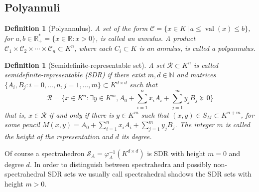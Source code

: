 \documentclass[sigconf]{acmart}
\newcommand{\R}{\mathbb{R}} %
\newcommand{\N}{\mathbb{N}} %
\newtheorem{definition}[theorem]{Definition}
\DeclareMathOperator{\val}{val}
\begin{document}
\subsection{Polyannuli}


\begin{definition}[Polyannulus]\label{def_annuli}
  A set of the form $\mathcal{C} = \{x \in K \,|\, a \le \val(x) \le b\}$, for $a,b \in \R^*_+ = \{x \in \R : x>0\}$,
  is called an \emph{annulus}. A product $\mathcal{C}_1 \times \mathcal{C}_2 \times \cdots \times \mathcal{C}_n \subset K^n$,
  where each $C_i \subset K$ is an annulus, is called a \emph{polyannulus}.
\end{definition}

\begin{definition}[Semidefinite-representable set]\label{def_semi_def_rep_set}
  A set $\mathcal{R} \subset K^n$ is called
  \emph{semide\-fi\-nite-re\-pre\-sen\-ta\-ble (SDR)} if there exist $m,d \in \N$ and
  matrices $\{A_i,B_j : i = 0, \ldots, n, j = 1, \ldots, m\} \subset K^{d \times d}$ such that
  $$
  \mathcal{R} = \Big\{x \in K^n : \exists y \in K^m, A_0+\sum_{i=1}^n x_iA_i + \sum_{j=1}^m y_jB_j \succeq 0\Big\}
  $$
  that is, $x \in \mathcal{R}$ if and only if there is $y \in K^m$ such that
  $(x,y) \in S_M \subset K^{n+m}$, for some pencil $M(x,y) = A_0+\sum_{i=1}^n x_iA_i + \sum_{j=1}^m y_jB_j$.
  The integer $m$ is called the \emph{height} of the representation and $d$ its \emph{degree}.
\end{definition}

Of course a spectrahedron $\mathcal{S}_A = \varphi_A^{-1}(K^{d \times d})$ is SDR with height $m=0$ and degree
$d$. In order to distinguish between spectrahedra and possibly non-spectrahedral SDR sets
we usually call {spectrahedral shadows} the SDR sets with height $m>0$.
\end{document}
